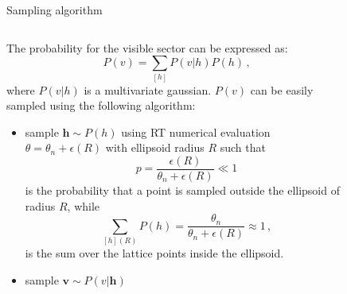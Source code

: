 \documentclass[10pt]{beamer}
\begin{document}
\begin{frame}{Sampling algorithm} 
    \begin{columns}
        \begin{column}[]{0.6 \textwidth}
            The probability for the visible sector can be expressed as:
            \begin{equation*}
                P(v) = \sum_{[h]} P(v|h)P(h)\,,
            \end{equation*}
            where $P(v|h)$ is a multivariate gaussian. $P(v)$ can be easily sampled using the
            following algorithm:
            \begin{itemize}
                \item sample $\textbf{h} \sim P(h)$ using RT numerical evaluation $\theta = \theta_n + \epsilon(R)$
                with ellipsoid radius $R$ such that
            \begin{equation*}
                p = \frac{\epsilon(R)}{\theta_n + \epsilon(R)} \ll 1 
            \end{equation*} 
            is the probability that a point is sampled outside the ellipsoid of radius $R$,
            while
            \begin{equation*}
                \sum_{[h](R)} P(h) = \frac{\theta_n}{\theta_n+\epsilon(R)}\approx 1\,,
            \end{equation*}
            is the sum over the lattice points inside the ellipsoid.
            \item sample $\textbf{v} \sim P(v|\textbf{h})$
            \end{itemize}
        \end{column}
        \begin{column}[]{0.4 \textwidth}
            \begin{figure}[t!]
                \begin{center}

\end{center}
\end{figure}
\end{column}
\end{columns}
\end{frame}
\end{document}

